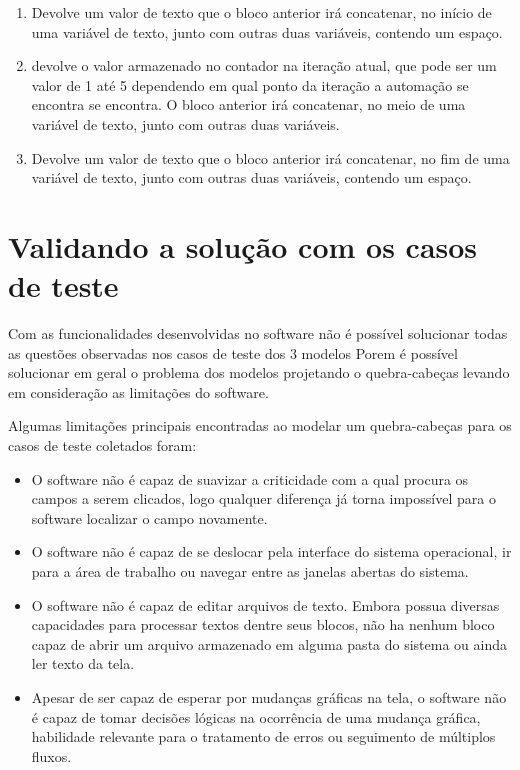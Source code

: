 \documentclass[tg]{mdtufsm}
\begin{document}
\begin{enumerate}[label*=\arabic*.]
\begin{enumerate}[label*=\arabic*.]
                    \end{enumerate}
                    \item Devolve um valor de texto que o bloco anterior irá concatenar, no início de uma variável de texto, junto com outras duas variáveis, contendo um espaço.
                    \item devolve o valor armazenado no contador na iteração atual, que pode ser um valor de 1 até 5 dependendo em qual ponto da iteração a automação se encontra se encontra. O bloco anterior irá concatenar, no meio de uma variável de texto, junto com outras duas variáveis.
                    \item Devolve um valor de texto que o bloco anterior irá concatenar, no fim de uma variável de texto, junto com outras duas variáveis, contendo um espaço.
                \end{enumerate}

            \section {Validando a solução com os casos de teste}

                Com as funcionalidades desenvolvidas no software não é possível solucionar todas as questões observadas nos casos de teste dos 3 modelos Porem é possível solucionar em geral o problema dos modelos projetando o quebra-cabeças levando em consideração as limitações do software.

                Algumas limitações principais encontradas ao modelar um quebra-cabeças para os casos de teste coletados foram:

                \begin{itemize}
                    \item O software não é capaz de suavizar a criticidade com a qual procura os campos a serem clicados, logo qualquer diferença já torna impossível para o software localizar o campo novamente.
                    \item O software não é capaz de se deslocar pela interface do sistema operacional, ir para a área de trabalho ou navegar entre as janelas abertas do sistema.
                    \item O software não é capaz de editar arquivos de texto. Embora possua diversas capacidades para processar textos dentre seus blocos, não ha nenhum bloco capaz de abrir um arquivo armazenado em alguma pasta do sistema ou ainda ler texto da tela.
                    \item Apesar de ser capaz de esperar por mudanças gráficas na tela, o software não é capaz de tomar decisões lógicas na ocorrência de uma mudança gráfica, habilidade relevante para o tratamento de erros ou seguimento de múltiplos fluxos.
                \end{itemize}
\end{document}
